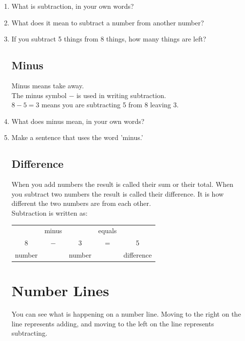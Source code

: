 \documentclass[12pt]{article}
\begin{document}
\begin{enumerate}

\item What is subtraction, in your own words?
\item What does it mean to subtract a number from another number?
\item If you subtract 5 things from 8 things, how many things are left?

\subsection*{Minus}
Minus means take away.\\

The minus symbol $-$ is used in writing subtraction.\\

$8-5=3$ means you are subtracting 5 from 8 leaving 3.

\item What does minus mean, in your own words?
\item Make a sentence that uses the word 'minus.'

\subsection*{Difference}
When you add numbers the result is called their sum or their total. When you subtract two numbers the result is called their difference. It is how different the two numbers are from each other.\\

Subtraction is written as:

\begin{table}[H]
    \centering
    \begin{tabular}{ccccc}
     \   & minus  &   \    & equals &  \ \\
     \large{8}    &  \large{$-$}    &   \large{3}    &   \large{=}    &  \large{5} \\
   number      &  \     &  number      &   \    & difference
    \end{tabular}
\end{table}

\newpage

\section*{Number Lines}
You can see what is happening on a number line. Moving to the right on the line represents adding, and moving to the left on the line represents subtracting.\\


\end{enumerate}
\end{document}
